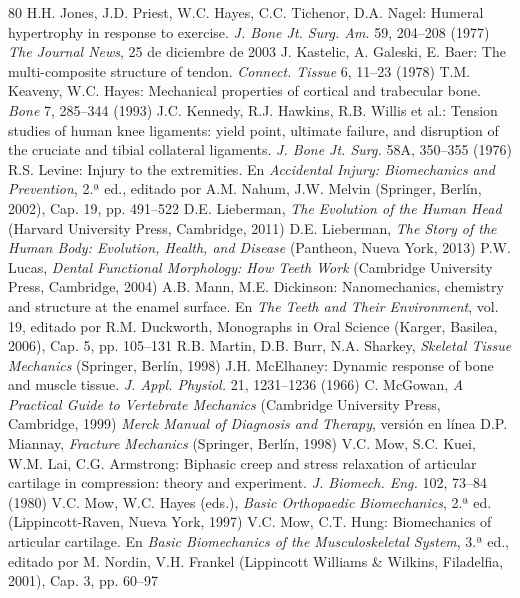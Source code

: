 \documentclass[12pt]{book}
\begin{document}
\begin{thebibliography}{80}
   H.H. Jones, J.D. Priest, W.C. Hayes, C.C. Tichenor, D.A. Nagel: Humeral hypertrophy in response to exercise. \textit{J. Bone Jt. Surg. Am.} 59, 204--208 (1977)
   \textit{The Journal News}, 25 de diciembre de 2003
   J. Kastelic, A. Galeski, E. Baer: The multi-composite structure of tendon. \textit{Connect. Tissue} 6, 11--23 (1978)
   T.M. Keaveny, W.C. Hayes: Mechanical properties of cortical and trabecular bone. \textit{Bone} 7, 285--344 (1993)
   J.C. Kennedy, R.J. Hawkins, R.B. Willis et al.: Tension studies of human knee ligaments: yield point, ultimate failure, and disruption of the cruciate and tibial collateral ligaments. \textit{J. Bone Jt. Surg.} 58A, 350--355 (1976)
   R.S. Levine: Injury to the extremities. En \textit{Accidental Injury: Biomechanics and Prevention}, 2.ª ed., editado por A.M. Nahum, J.W. Melvin (Springer, Berlín, 2002), Cap. 19, pp. 491--522
   D.E. Lieberman, \textit{The Evolution of the Human Head} (Harvard University Press, Cambridge, 2011)
   D.E. Lieberman, \textit{The Story of the Human Body: Evolution, Health, and Disease} (Pantheon, Nueva York, 2013)
   P.W. Lucas, \textit{Dental Functional Morphology: How Teeth Work} (Cambridge University Press, Cambridge, 2004)
   A.B. Mann, M.E. Dickinson: Nanomechanics, chemistry and structure at the enamel surface. En \textit{The Teeth and Their Environment}, vol. 19, editado por R.M. Duckworth, Monographs in Oral Science (Karger, Basilea, 2006), Cap. 5, pp. 105--131
   R.B. Martin, D.B. Burr, N.A. Sharkey, \textit{Skeletal Tissue Mechanics} (Springer, Berlín, 1998)
   J.H. McElhaney: Dynamic response of bone and muscle tissue. \textit{J. Appl. Physiol.} 21, 1231--1236 (1966)
   C. McGowan, \textit{A Practical Guide to Vertebrate Mechanics} (Cambridge University Press, Cambridge, 1999)
   \textit{Merck Manual of Diagnosis and Therapy}, versión en línea
   D.P. Miannay, \textit{Fracture Mechanics} (Springer, Berlín, 1998)
   V.C. Mow, S.C. Kuei, W.M. Lai, C.G. Armstrong: Biphasic creep and stress relaxation of articular cartilage in compression: theory and experiment. \textit{J. Biomech. Eng.} 102, 73--84 (1980)
   V.C. Mow, W.C. Hayes (eds.), \textit{Basic Orthopaedic Biomechanics}, 2.ª ed. (Lippincott-Raven, Nueva York, 1997)
   V.C. Mow, C.T. Hung: Biomechanics of articular cartilage. En \textit{Basic Biomechanics of the Musculoskeletal System}, 3.ª ed., editado por M. Nordin, V.H. Frankel (Lippincott Williams \& Wilkins, Filadelfia, 2001), Cap. 3, pp. 60--97

\end{thebibliography}
\end{document}
